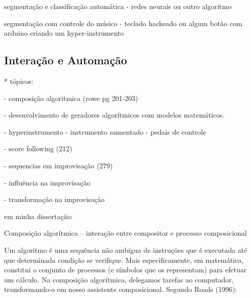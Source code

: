 \documentclass{ppgmus}
\begin{document}
segmentação e classificação automática - redes neurais ou outro algoritmo

segmentação com controle do músico - teclado hackeado ou
algum botão com arduino criando um hyper-instrumento


\subsection{Interação e Automação}


* tópicos:


- composição algoritmica (rowe pg 201-203)

- desenvolvimento de geradores algorítmicos com modelos matemáticos.

- hyperinstrumento - instrumento aumentado - pedais de controle

- score following (212)

- sequencias em improvisação (279)

- influência na improvisação

- transformação na improvisação


em minha dissertação:

Composição algorítmica – interação entre compositor e  processo composicional

Um algoritmo é uma sequência não ambígua de instruções que é executada até que determinada condição se 
verifique. Mais especificamente, em matemática, constitui o conjunto de processos 
(e símbolos que os representam) para efetuar um cálculo. Na composição algorítmica, delegamos tarefas 
ao computador, transformando-o em nosso assistente composicional. Segundo Roads (1996):
\end{document}
